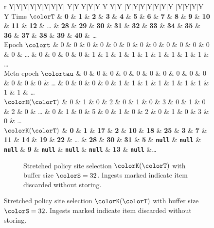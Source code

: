 \begin{figure}[htbp!]
  \centering

\begin{minipage}{\textwidth}
  \scriptsize
  \setlength{\tabcolsep}{2.5pt}
  \begin{tabularx}{\textwidth}{
    r
    Y|Y|Y|Y|Y|Y|Y|Y|
    Y|Y|Y|Y|Y Y Y|Y
    |Y|Y|Y|Y|Y|Y|Y
    |Y|Y|Y|Y Y
    }
     { Time $\colorT$} & \textbf{0} & \textbf{1} & \textbf{2} & \textbf{3} & \textbf{4} & \textbf{5} & \textbf{6} & \textbf{7}
    & \textbf{8} & \textbf{9} & \textbf{10} & \textbf{11} & \textbf{12} %
    &  \ldots
    & \textbf{28} & \textbf{29} & \textbf{30} & \textbf{31}
    & \textbf{32} & \textbf{33} & \textbf{34} & \textbf{35}
    & \textbf{36} & \textbf{37} & \textbf{38} & \textbf{39} & \textbf{40}
    & \ldots \\ \hline
   { Epoch $\colort$} & 0 & 0 & 0 & 0 & 0 & 0 & 0 & 0
    & 0 & 0 & 0 & 0 & 0 %
    &  \ldots
    & 0 & 0 & 0 & 0
    & 1 & 1 & 1 & 1
    & 1 & 1 & 1 & 1 & 1
    & \ldots \\
   { Meta-epoch $\colortau$} & 0 & 0 & 0 & 0 & 0 & 0 & 0 & 0
    & 0 & 0 & 0 & 0 & 0 %
    &  \ldots
    & 0 & 0 & 0 & 0
    & 1 & 1 & 1 & 1
    & 1 & 1 & 1 & 1 & 1
    & \ldots \\
    { \scriptsize$\colorH(\colorT)$} & 0 & 1 & 0 & 2 & 0 & 1 & 0 & 3
    & 0 & 1 & 0 & 2 & 0 %
    &  \ldots
    & 0 & 1 & 0 & 5
    & 0 & 1 & 0 & 2
    & 0 & 1 & 0 & 3 & 0
    & \ldots \\ \hline
     { \scriptsize $\colorK(\colorT)$} & \textbf{0} & \textbf{1} & \textbf{17} & \textbf{2} & \textbf{10} & \textbf{18} & \textbf{25} & \textbf{3}
     & \textbf{7} & \textbf{11} & \textbf{14} & \textbf{19} & \textbf{22} & \ldots
 & \textbf{28} & \textbf{30} & \textbf{31} & \textbf{5} & {\tiny \texttt{\textbf{null\hphantom{}}}}  %
 & {\tiny \texttt{\textbf{null\hphantom{}}}} & {\tiny \texttt{\textbf{null\hphantom{}}}}  & \textbf{9} & {\tiny \texttt{\textbf{null\hphantom{}}}}
 & {\tiny \texttt{\textbf{null\hphantom{}}}} & {\tiny \texttt{\textbf{null\hphantom{}}}} & \textbf{13} & {\tiny \texttt{\textbf{null\hphantom{}}}}  &\ldots
  \end{tabularx}
\end{minipage}
\begin{subfigure}{\textwidth}
\vspace{-1ex}
\caption{\footnotesize Stretched policy site selection $\colorK(\colorT)$ with buffer size $\colorS=32$. Ingests marked \nullval{} indicate item discarded without storing.}
\label{fig:hsurf-stretched-implementation-site-selection}
\end{subfigure}


\end{figure}
